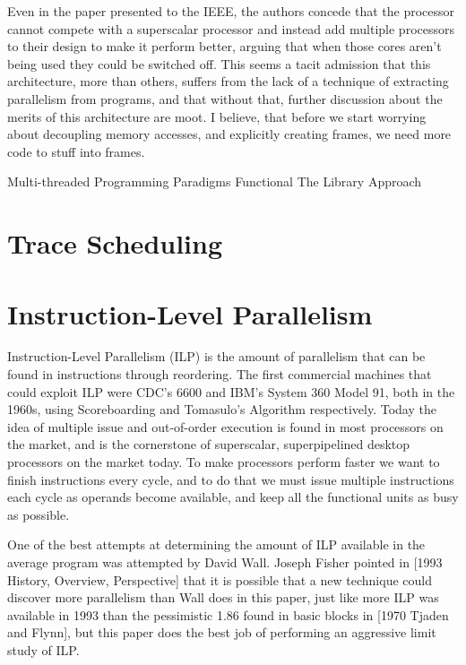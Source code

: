 \documentclass[12pt,twoside,letterpaper]{article}
\begin{document}
Even in the paper presented to the IEEE, the authors concede that the processor cannot compete with a superscalar processor and instead add multiple processors to their design to make it perform better, arguing that when those cores aren’t being used they could be switched off. This seems a tacit admission that this architecture, more than others, suffers from the lack of a technique of extracting parallelism from programs, and that without that, further discussion about the merits of this architecture are moot. I believe, that before we start worrying about decoupling memory accesses, and explicitly creating frames, we need  more code to stuff into frames. 

Multi-threaded Programming Paradigms
Functional
The Library Approach

\section*{Trace Scheduling}

\section*{Instruction-Level Parallelism}
Instruction-Level Parallelism (ILP) is the amount of parallelism that can be found in instructions through reordering. The first commercial machines that could exploit ILP were CDC’s 6600 and IBM’s System 360 Model 91, both in the 1960s, using Scoreboarding and Tomasulo’s Algorithm respectively. Today the idea of multiple issue and out-of-order execution is found in most processors on the market, and is the cornerstone of superscalar, superpipelined desktop processors on the market today. To make processors perform faster we want to finish instructions every cycle, and to do that we must issue multiple instructions each cycle as operands become available, and keep all the functional units as busy as possible.

One of the best attempts at determining the amount of ILP available in the average program was attempted by David Wall. Joseph Fisher pointed in [1993 History, Overview, Perspective] that it is possible that a new technique could discover more parallelism than Wall does in this paper, just like more ILP was available in 1993 than the pessimistic 1.86 found in basic blocks in [1970 Tjaden and Flynn], but this paper does the best job of performing an aggressive limit study of ILP.
\end{document}
